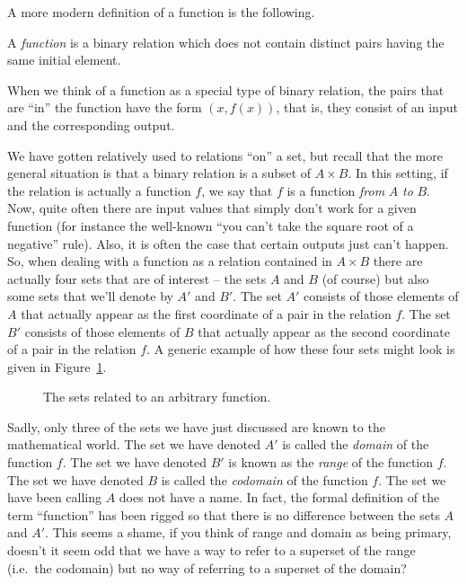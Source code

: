 A more modern definition of a function is the following.

\begin{defi}
 A \emph{function} is a binary relation which does not contain
distinct pairs having the same initial element.
\end{defi}

When we think of a function as a special type of binary relation, 
the pairs that are ``in'' the function have the form $(x, f(x))$,
that is, they consist of an input and the corresponding output.

We have gotten relatively used to relations ``on'' a set, but recall
that the more general situation is that a binary relation is 
a subset of $A \times B$.  In this setting, if the relation is 
actually a function $f$, we say that $f$ is a function \emph{from} $A$
\emph{to} $B$.  Now, quite often there are input values  that simply don't 
work for a given function (for instance the well-known ``you can't take
the square root of a negative'' rule).  Also, it is often the case that
certain outputs just can't happen.  So, when dealing with a function
as a relation contained in $A \times B$ there are actually four sets
that are of interest -- the sets $A$ and $B$ (of course) but also some
sets that we'll denote by $A'$ and $B'$.  The set $A'$ consists of those
elements of $A$ that actually appear as the first coordinate of a pair
in the relation $f$.  The set $B'$ consists of those elements of $B$
that actually appear as the second coordinate of a pair in the relation $f$.
A generic example of how these four sets might look is given in Figure~\ref{fig:generic_function}.

\begin{figure}[!hbtp]

\caption{The sets related to an arbitrary function.}
\label{fig:generic_function} 
\end{figure}

Sadly, only three of the sets we have just discussed are known to
the mathematical world.  The set we have denoted $A'$ is called the
\emph{domain} of the function $f$.  The set we have denoted $B'$ is 
known as the \emph{range} of the function $f$.  The set we have denoted
$B$ is called the \emph{codomain} of the function $f$.  The set we 
have been calling $A$ does not have a name.  In fact, the formal
definition of the term ``function'' has been rigged so that there
is no difference between the sets $A$ and $A'$.  This seems a shame,
if you think of range and domain as being primary, doesn't it seem
odd that we have a way to refer to a superset of the range (i.e.\ the 
codomain) but no way of referring to a superset of the domain?

